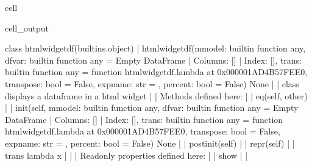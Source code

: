 \documentclass[letterpaper,10pt,english]{jupyterBook}
\begin{document}
\begin{sphinxuseclass}{cell}
\begin{sphinxVerbatimOutput}
\begin{sphinxuseclass}{cell_output}
\begin{sphinxVerbatim}[commandchars=\\\{\}]
    class htmlwidget\PYGZus{}df(builtins.object)
     |  htmlwidget\PYGZus{}df(mmodel: \PYGZlt{}built\PYGZhy{}in function any\PYGZgt{}, df\PYGZus{}var: \PYGZlt{}built\PYGZhy{}in function any\PYGZgt{} = Empty DataFrame
     |  Columns: []
     |  Index: [], trans: \PYGZlt{}built\PYGZhy{}in function any\PYGZgt{} = \PYGZlt{}function htmlwidget\PYGZus{}df.\PYGZlt{}lambda\PYGZgt{} at 0x000001AD4B57FEE0\PYGZgt{}, transpose: bool = False, expname: str = \PYGZsq{}\PYGZsq{}, percent: bool = False) \PYGZhy{}\PYGZgt{} None
     |  
     |  class displays a dataframe in a html widget
     |  
     |  Methods defined here:
     |  
     |  \PYGZus{}\PYGZus{}eq\PYGZus{}\PYGZus{}(self, other)
     |  
     |  \PYGZus{}\PYGZus{}init\PYGZus{}\PYGZus{}(self, mmodel: \PYGZlt{}built\PYGZhy{}in function any\PYGZgt{}, df\PYGZus{}var: \PYGZlt{}built\PYGZhy{}in function any\PYGZgt{} = Empty DataFrame
     |  Columns: []
     |  Index: [], trans: \PYGZlt{}built\PYGZhy{}in function any\PYGZgt{} = \PYGZlt{}function htmlwidget\PYGZus{}df.\PYGZlt{}lambda\PYGZgt{} at 0x000001AD4B57FEE0\PYGZgt{}, transpose: bool = False, expname: str = \PYGZsq{}\PYGZsq{}, percent: bool = False) \PYGZhy{}\PYGZgt{} None
     |  
     |  \PYGZus{}\PYGZus{}post\PYGZus{}init\PYGZus{}\PYGZus{}(self)
     |  
     |  \PYGZus{}\PYGZus{}repr\PYGZus{}\PYGZus{}(self)
     |  
     |  trans lambda x
     |  
     |  \PYGZhy{}\PYGZhy{}\PYGZhy{}\PYGZhy{}\PYGZhy{}\PYGZhy{}\PYGZhy{}\PYGZhy{}\PYGZhy{}\PYGZhy{}\PYGZhy{}\PYGZhy{}\PYGZhy{}\PYGZhy{}\PYGZhy{}\PYGZhy{}\PYGZhy{}\PYGZhy{}\PYGZhy{}\PYGZhy{}\PYGZhy{}\PYGZhy{}\PYGZhy{}\PYGZhy{}\PYGZhy{}\PYGZhy{}\PYGZhy{}\PYGZhy{}\PYGZhy{}\PYGZhy{}\PYGZhy{}\PYGZhy{}\PYGZhy{}\PYGZhy{}\PYGZhy{}\PYGZhy{}\PYGZhy{}\PYGZhy{}\PYGZhy{}\PYGZhy{}\PYGZhy{}\PYGZhy{}\PYGZhy{}\PYGZhy{}\PYGZhy{}\PYGZhy{}\PYGZhy{}\PYGZhy{}\PYGZhy{}\PYGZhy{}\PYGZhy{}\PYGZhy{}\PYGZhy{}\PYGZhy{}\PYGZhy{}\PYGZhy{}\PYGZhy{}\PYGZhy{}\PYGZhy{}\PYGZhy{}\PYGZhy{}\PYGZhy{}\PYGZhy{}\PYGZhy{}\PYGZhy{}\PYGZhy{}\PYGZhy{}\PYGZhy{}\PYGZhy{}\PYGZhy{}
     |  Readonly properties defined here:
     |  
     |  show
     |  
     |  \PYGZhy{}\PYGZhy{}\PYGZhy{}\PYGZhy{}\PYGZhy{}\PYGZhy{}\PYGZhy{}\PYGZhy{}\PYGZhy{}\PYGZhy{}\PYGZhy{}\PYGZhy{}\PYGZhy{}\PYGZhy{}\PYGZhy{}\PYGZhy{}\PYGZhy{}\PYGZhy{}\PYGZhy{}\PYGZhy{}\PYGZhy{}\PYGZhy{}\PYGZhy{}\PYGZhy{}\PYGZhy{}\PYGZhy{}\PYGZhy{}\PYGZhy{}\PYGZhy{}\PYGZhy{}\PYGZhy{}\PYGZhy{}\PYGZhy{}\PYGZhy{}\PYGZhy{}\PYGZhy{}\PYGZhy{}\PYGZhy{}\PYGZhy{}\PYGZhy{}\PYGZhy{}\PYGZhy{}\PYGZhy{}\PYGZhy{}\PYGZhy{}\PYGZhy{}\PYGZhy{}\PYGZhy{}\PYGZhy{}\PYGZhy{}\PYGZhy{}\PYGZhy{}\PYGZhy{}\PYGZhy{}\PYGZhy{}\PYGZhy{}\PYGZhy{}\PYGZhy{}\PYGZhy{}\PYGZhy{}\PYGZhy{}\PYGZhy{}\PYGZhy{}\PYGZhy{}\PYGZhy{}\PYGZhy{}\PYGZhy{}\PYGZhy{}\PYGZhy{}\PYGZhy{}

\end{sphinxVerbatim}
\end{sphinxuseclass}
\end{sphinxVerbatimOutput}
\end{sphinxuseclass}
\end{document}
